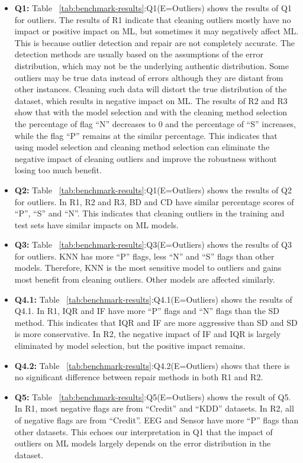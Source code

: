 \begin{itemize}
	\item {
		\textbf{Q1:} Table ~\ref{tab:benchmark-results}:Q1(E=Outliers) shows the results of Q1 for outliers.
		The results of R1 indicate that cleaning outliers mostly have no impact or positive impact on ML, but sometimes it may negatively affect ML. This is because outlier detection and repair are not completely accurate. The detection methods are usually based on the assumptions of the error distribution, which may not be the underlying authentic distribution. Some outliers may be true data instead of errors although they are distant from other instances. Cleaning
		such data will distort the true distribution of the dataset, which results in negative impact on ML.
		The results of R2 and R3 show that with the model selection and with the cleaning method selection the percentage of flag “N” decreases to 0 and the percentage of “S” increases, while the flag “P”
		remains at the similar percentage. This indicates that using model selection and cleaning method selection can eliminate the negative impact of cleaning outliers and improve the robustness without losing too much benefit.
	}
	\item {
		\textbf{Q2:} Table ~\ref{tab:benchmark-results}:Q1(E=Outliers) shows the results of Q2 for outliers. 
		In R1, R2 and R3, BD and CD have similar percentage scores of “P”, “S” and “N”. This indicates that cleaning outliers in the training and test sets have similar impacts on ML models.
	}
	\item {
		\textbf{Q3:} Table ~\ref{tab:benchmark-results}:Q3(E=Outliers) shows the results of Q3 for outliers. KNN has more “P” flags, less “N” and “S” flags than other models. Therefore, KNN is the most sensitive model to outliers
		and gains most benefit from cleaning outliers. Other models are affected similarly.
	} 
	\item {
	\textbf{Q4.1:} Table ~\ref{tab:benchmark-results}:Q4.1(E=Outliers) shows the results of Q4.1. In
		R1, IQR and IF have more “P” flags and “N” flags than the SD method. This indicates that IQR and IF are more aggressive than SD and SD is more conservative. In R2, the negative impact of IF and IQR is largely eliminated by model selection, but the positive impact remains.
	}
	\item {
		\textbf{Q4.2:} Table ~\ref{tab:benchmark-results}:Q4.2(E=Outliers) shows that there is no significant difference between repair methods in both R1 and R2.
	}
	\item {
		\textbf{Q5:} Table ~\ref{tab:benchmark-results}:Q5(E=Outliers) shows the result of Q5. In R1,
		most negative flags are from “Credit” and “KDD” datasets. In R2, all of negative flags are from “Credit”. EEG and Sensor have more
		“P” flags than other datasets. This echoes our interpretation in Q1 that the impact of outliers on ML models largely depends on the
		error distribution in the dataset.
	}
\end{itemize}

